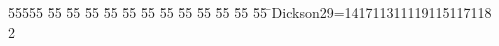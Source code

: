 %
%
\begin{tabbing}
55555 \= 55 \= 55 \= 55 \= 55 \= 55 \= 55 \= 55 \= 55 \= 55 \= 55 \= 55 \= 55 \= \>Dickson29=141711311119115117118\\[0pt]
2\>\end{tabbing}
